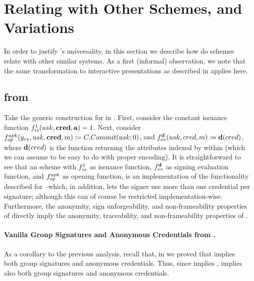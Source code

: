 \section{Relating \UAS with Other Schemes, and Variations}
\label{sec:transformations}

In order to justify \UAS's universality, in this section we describe how do
\UAS schemes relate with other similar systems. 
%
As a first (informal) observation, we note that the same transformation to
interactive presentations as described in \GSAC applies here.

\subsection{\GSAC from \UAS}
Take the generic construction for \UAS in .
First, consider the constant issuance function $f_{is}^1(usk,\mathbf{cred},\mathbf{a}) =
1$. Next, consider $f_{op}^{upk}(y_{ev},usk,\mathbf{cred},m) \coloneqq
C.Commit(usk;0)$, and $f_{ev}^{\mathbf{d}}(usk,cred,m) \coloneqq \mathbf{d}(cred)$,
where $\mathbf{d}(cred)$ is the function returning the attributes indexed by
\dattrs within \cred (which we can assume to be easy to do with proper
encoding). It is straightforward to see that an \UAS scheme with $f_{is}^1$
as issuance function, $f_{ev}^{\mathbf{d}}$ as signing evaluation function, and
$f_{op}^{upk}$ as opening function, is an implementation of the functionality
described for \GSAC --which, in addition, lets the signer use more than one
credential per signature; although this can of course be restricted
implementation-wise.
%
Furthermore, the anonymity, sign unforgeability, and non-frameability properties
of \UAS directly imply the anonymity, traceability, and non-frameability
properties of \GSAC.

\paragraph{Vanilla Group Signatures and Anonymous Credentials from \UAS.} As a
corollary to the previous analysis, recall that, in 
we proved that \GSAC implies both group signatures and anonymous credentials.
Thus, since \UAS implies \GSAC, \UAS implies also both group signatures and
anonymous credentials.


